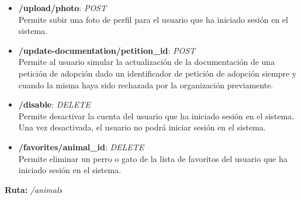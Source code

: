 \begin{itemize}
    \item \textbf{/upload/photo}: \textit{POST} \\
    Permite subir una foto de perfil para el usuario que ha iniciado sesión en el sistema.
    \item \textbf{/update-documentation/{petition\_id}}: \textit{POST} \\
    Permite al usuario simular la actualización de la documentación de una petición de adopción dado un identificador de petición de adopción
    siempre y cuando la misma haya sido rechazada por la organización previamente.
    \item \textbf{/disable}: \textit{DELETE} \\
    Permite desactivar la cuenta del usuario que ha iniciado sesión en el sistema. Una vez desactivada, el usuario no podrá iniciar sesión en el sistema.
    \item \textbf{/favorites/{animal\_id}}: \textit{DELETE} \\
    Permite eliminar un perro o gato de la lista de favoritos del usuario que ha iniciado sesión en el sistema.
\end{itemize}

\textbf{Ruta:} \textit{/animals}

